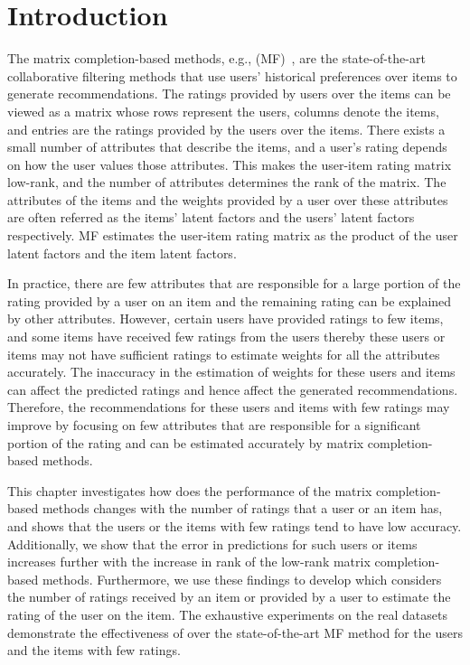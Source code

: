 \section{Introduction} 
\label{ch:tmf:intro}


The matrix completion-based methods, e.g., \MF (MF)~\cite{Koren2009,
koren2008factorization, hu2008collaborative}, are the state-of-the-art
collaborative filtering methods that use users' historical preferences 
over items to generate recommendations. The ratings provided by users over
the items can be viewed as a matrix whose rows represent the users, columns
denote the items, and entries are the ratings provided by the users over the
items.  There exists a small number of attributes that describe the items, and
a user's rating depends on how the user values those attributes. This makes the
user-item rating matrix low-rank, and the number of attributes determines the
rank of the matrix. The attributes of the items and the weights provided by
a user over these attributes are often referred as the items' latent factors
and the users' latent factors respectively. MF estimates the user-item rating
matrix as the product of the user latent factors and the item latent factors.  


In practice, there are few attributes that are responsible for a large
portion of the rating provided by a user on an item and the remaining rating
can be explained by other attributes. However, certain users have provided
ratings to few items, and some items have received few ratings from the users
thereby these users or items may not have sufficient ratings to estimate weights
for all the attributes accurately. The inaccuracy in the estimation of weights
for these users and items can affect the predicted ratings and hence affect
the generated recommendations. Therefore, the recommendations for these users
and items with few ratings may improve by focusing on few attributes that
are responsible for a significant portion of the rating and can be estimated
accurately by matrix completion-based methods.


This chapter investigates how does the performance of the matrix
completion-based methods changes with the number of ratings that a
user or an item has, and shows that the users or the items with few
ratings tend to have low accuracy. Additionally, we show that the error
in predictions for such users or items increases further with the 
increase in rank of the low-rank matrix completion-based methods. 
Furthermore, we use these findings to develop \TMF which considers the number of
ratings received by an item or provided by a user to estimate the rating of the
user on the item. 
The exhaustive experiments on the real datasets demonstrate the effectiveness of
\TMF over the state-of-the-art MF method for the users and the items with few
ratings.





